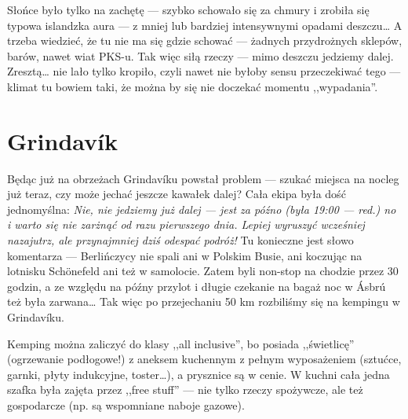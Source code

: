 Słońce było tylko na zachętę --- szybko schowało się za chmury i zrobiła się typowa islandzka aura --- z mniej lub bardziej intensywnymi opadami deszczu… A trzeba wiedzieć, że tu nie ma się gdzie schować --- żadnych przydrożnych sklepów, barów, nawet wiat PKS-u. Tak więc siłą rzeczy --- mimo deszczu jedziemy dalej. Zresztą… nie lało tylko kropiło, czyli nawet nie byłoby sensu przeczekiwać tego --- klimat tu bowiem taki, że można by się nie doczekać momentu ,,wypadania''.

\section*{Grindavík}

Będąc już na obrzeżach Grindavíku powstał problem --- szukać miejsca na nocleg już teraz, czy może jechać jeszcze kawałek dalej? Cała ekipa była dość jednomyślna: \emph{Nie, nie jedziemy już dalej --- jest za późno (była 19:00 --- red.) no i warto się nie zarżnąć od razu pierwszego dnia. Lepiej wyruszyć wcześniej nazajutrz, ale przynajmniej dziś odespać podróż!} Tu konieczne jest słowo komentarza --- Berlińczycy nie spali ani w Polskim Busie, ani koczując na lotnisku Schönefeld ani też w samolocie. Zatem byli non-stop na chodzie przez 30 godzin, a ze względu na późny przylot i długie czekanie na bagaż noc w Ásbrú też była zarwana… Tak więc po przejechaniu 50 km rozbiliśmy się na kempingu w Grindavíku.

Kemping można zaliczyć do klasy ,,all inclusive'', bo posiada ,,świetlicę'' (ogrzewanie podłogowe!) z aneksem kuchennym z pełnym wyposażeniem (sztućce, garnki, płyty indukcyjne, toster…), a prysznice są w cenie. W kuchni cała jedna szafka była zajęta przez ,,free stuff'' --- nie tylko rzeczy spożywcze, ale też gospodarcze (np. są wspomniane naboje gazowe).



